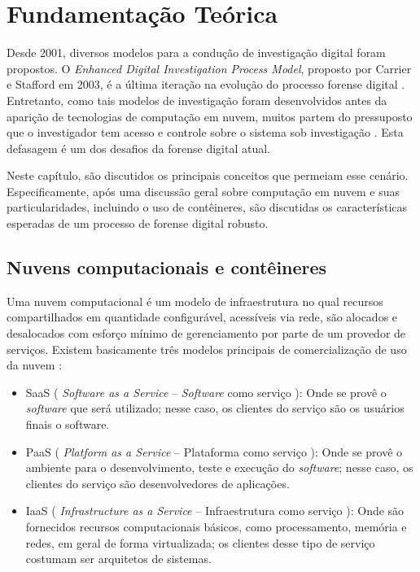 \chapter{Fundamentação Teórica}
\label{chp:fundamentação}


Desde 2001, diversos modelos para a condução de investigação digital foram propostos. 
%
O \textit{Enhanced Digital Investigation Process Model}, proposto por Carrier e Stafford em 2003, é a última iteração na evolução do processo forense digital \cite{GrisposChallengesCloudComputing:2012}.
%
Entretanto, como tais modelos de investigação foram desenvolvidos antes da aparição de tecnologias de computação em nuvem, muitos partem do pressuposto que o investigador tem acesso e controle sobre o sistema sob investigação \cite{GrisposChallengesCloudComputing:2012}.
%
Esta defasagem é um dos desafios da forense digital atual.


Neste capítulo, são discutidos os principais conceitos que permeiam esse cenário.
%
Especificamente, após uma discussão geral sobre computação em nuvem e suas particularidades, incluindo o uso de contêineres, são discutidas os características esperadas de um processo de forense digital robusto.


\section{Nuvens computacionais e contêineres}
\label{sec:computacaonuvem}

Uma nuvem computacional é um modelo de infraestrutura no qual recursos compartilhados em quantidade configurável, acessíveis via rede, são alocados e desalocados com esforço mínimo de gerenciamento por parte de um provedor de serviços.
%
Existem basicamente três modelos principais de comercialização de uso da nuvem \cite{NIST2011}: 

\begin{itemize}
	\item SaaS ( \textit{Software as a Service} -- \textit{Software} como serviço ): Onde se provê o \textit{software} que será utilizado; nesse caso, os clientes do serviço são os usuários finais o software.
	
	\item PaaS ( \textit{Platform as a Service} -- Plataforma como serviço ): Onde se provê o ambiente para o desenvolvimento, teste e execução do \textit{software}; nesse caso, os clientes do serviço são desenvolvedores de aplicações.
	
	\item IaaS ( \textit{Infrastructure as a Service} -- Infraestrutura como serviço ): Onde são fornecidos recursos computacionais básicos, como processamento, memória e redes, em geral de forma virtualizada; os clientes desse tipo de serviço costumam ser arquitetos de sistemas.
\end{itemize}

